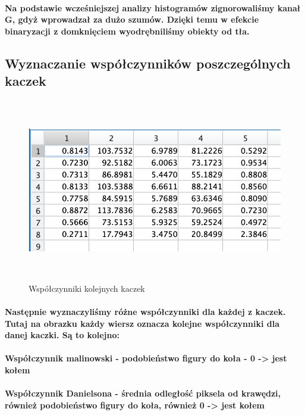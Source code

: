 \documentclass[a4paper,12pt]{article}
\begin{document}
\begin{justify}
\paragraph{Na podstawie wcześniejszej analizy histogramów zignorowaliśmy kanał G, gdyż wprowadzał za dużo szumów. Dzięki temu w efekcie binaryzacji z domknięciem wyodrębniliśmy obiekty od tła.}

\subsection{Wyznaczanie współczynników poszczególnych kaczek}

\begin{figure}[h]
\centering
\includegraphics[width=12cm, height=8cm]{15}
\caption{Współczynniki kolejnych kaczek}
\end{figure}

\paragraph{Następnie wyznaczyliśmy różne współczynniki dla każdej z kaczek. Tutaj na obrazku każdy wiersz oznacza kolejne współczynniki dla danej kaczki. Są to kolejno:}

\paragraph{Współczynnik malinowski - podobieństwo figury do koła - 0 -> jest kołem}

\paragraph{Współczynnik Danielsona - średnia odległość piksela od krawędzi,  również podobieństwo figury do koła, również 0 -> jest kołem}


\end{justify}
\end{document}

